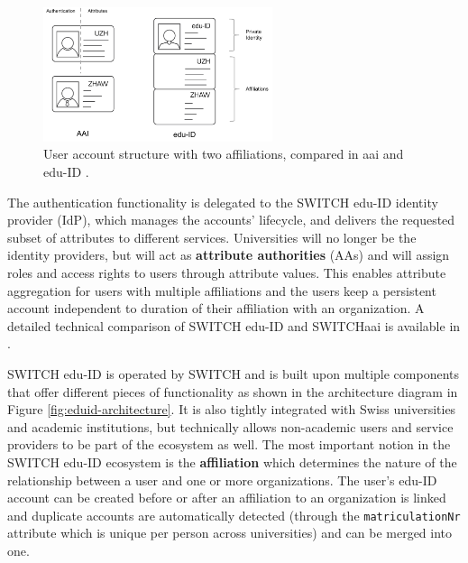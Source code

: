 \begin{figure}[H]
	\centering
	\captionsetup{width=\linewidth}
	\includegraphics[width=0.6\textwidth]{figs/ch3/eduid-vs-aai}
	\caption{User account structure with two affiliations, compared in aai and edu-ID \cite{eduid-architecture}.}
	\label{fig:eduid-user-attr}
\end{figure}

The authentication functionality is delegated to the SWITCH edu-ID identity provider (IdP), which manages the accounts' lifecycle, and delivers the requested subset of attributes to different services. Universities will no longer be the identity providers, but will act as \textbf{attribute authorities} (AAs) and will assign roles and access rights to users through attribute values. This enables attribute aggregation for users with multiple affiliations and the users keep a persistent account independent to duration of their affiliation with an organization. A detailed technical comparison of SWITCH edu-ID and SWITCHaai is available in \cite{eduid-vs-aai}.

SWITCH edu-ID is operated by SWITCH and is built upon multiple components that offer different pieces of functionality as shown in the architecture diagram in Figure \ref{fig:eduid-architecture}. It is also tightly integrated with Swiss universities and academic institutions, but technically allows non-academic users and service providers to be part of the ecosystem as well. The most important notion in the SWITCH edu-ID ecosystem is the \textbf{affiliation} which determines the nature of the relationship between a user and one or more organizations. The user's edu-ID account can be created before or after an affiliation to an organization is linked and duplicate accounts are automatically detected (through the \texttt{matriculationNr} attribute which is unique per person across universities) and can be merged into one. 

